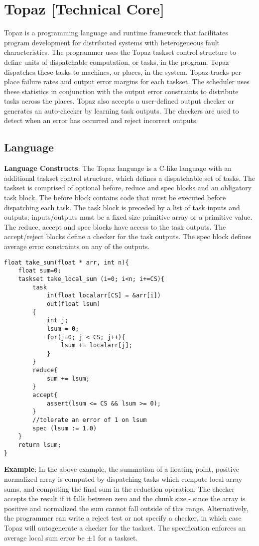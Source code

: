 \documentclass[11pt,twocolumn]{article}
\begin{document}
\section {Topaz [Technical Core]}
Topaz is a programming language and runtime framework that facilitates program development for distributed systems with heterogeneous fault characteristics. The programmer uses the Topaz taskset control structure to define units of dispatchable computation, or tasks, in the program. Topaz dispatches these tasks to machines, or places, in the system. Topaz tracks per-place failure rates and output error margins for each taskset. The scheduler uses these statistics in conjunction with the output error constraints to distribute tasks across the places. Topaz also accepts a user-defined output checker or generates an auto-checker by learning task outputs. The checkers are used to detect when an error has occurred and reject incorrect outputs.
\subsection {Language}
\textbf{Language Constructs}: The Topaz language is a C-like language with an additional taskset control structure, which defines a dispatchable set of tasks. The taskset is comprised of optional before, reduce and spec blocks and an obligatory task block. The before block contains code that must be executed before dispatching each task. The task block is preceded by a list of task inputs and outputs; inputs/outputs must be a fixed size primitive array or a primitive value. The reduce, accept and spec blocks have access to the task outputs. The accept/reject blocks define a checker for the task outputs. The spec block defines average error constraints on any of the outputs.\\

\begin{lstlisting}[mathescape]
float take_sum(float * arr, int n){
	float sum=0;
	taskset take_local_sum (i=0; i<n; i+=CS){
		task 
			in(float localarr[CS] = &arr[i])
			out(float lsum)
		{
			int j;
			lsum = 0;
			for(j=0; j < CS; j++){
				lsum += localarr[j];
			}
		}
		reduce{
			sum += lsum;
		}
		accept{
			assert(lsum <= CS && lsum >= 0);
		}
		//tolerate an error of 1 on lsum
		spec (lsum := 1.0) 
	}
	return lsum;
}
\end{lstlisting}
\textbf{Example}: In the above example, the summation of a floating point, positive normalized array is computed by dispatching tasks which compute local array sums, and computing the final sum in the reduction operation. The checker accepts the result if it falls between zero and the chunk size - since the array is positive and normalized the sum cannot fall outside of this range. Alternatively, the programmer can write a reject test or not specify a checker, in which case Topaz will autogenerate a checker for the taskset. The specification enforces an average local sum error be $\pm$1 for a taskset. 
\end{document}
